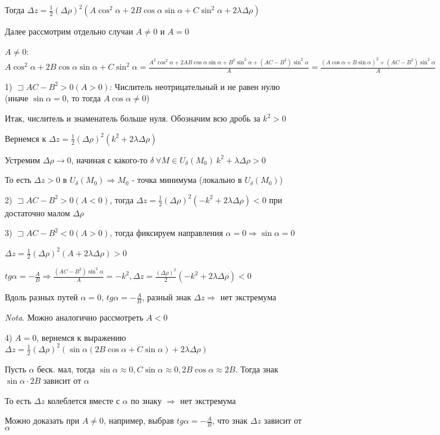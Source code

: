 \documentclass[12pt]{article}
\begin{document}
    Тогда $\displaystyle \Delta z = \frac{1}{2} (\Delta \rho)^2 (A\cos^2\alpha + 2B\cos\alpha\sin\alpha + C\sin^2\alpha + 2\lambda \Delta \rho)$

    Далее рассмотрим отдельно случаи $A \neq 0$ и $A = 0$

    $A \neq 0$: $\displaystyle A\cos^2\alpha + 2B\cos\alpha\sin\alpha + C\sin^2\alpha = \frac{A^2\cos^2\alpha + 2AB\cos\alpha\sin\alpha + B^2\sin^2\alpha + (AC - B^2)\sin^2\alpha}{A} =
    \frac{(A\cos\alpha + B\sin\alpha)^2 + (AC - B^2)\sin^2\alpha}{A}$

    1) $\sqsupset AC - B^2 > 0 (A > 0)$: Числитель неотрицательный и не равен нулю (иначе $\sin\alpha = 0$, то тогда $A\cos\alpha \neq 0$)

    Итак, числитель и знаменатель больше нуля. Обозначим всю дробь за $k^2 > 0$

    Вернемся к $\displaystyle \Delta z = \frac{1}{2}(\Delta \rho)^2 (k^2 + 2\lambda\Delta\rho)$

    Устремим $\Delta \rho \rightarrow 0$, начиная с какого-то $\delta \ \forall M \in U_\delta(M_0) \ k^2 + \lambda\Delta\rho > 0$

    То есть $\Delta z > 0$ в $U_\delta(M_0) \Longrightarrow M_0$ - точка минимума (локально в $U_\delta(M_0)$)

    2) $\sqsupset AC - B^2 > 0 (A < 0)$, тогда $\displaystyle \Delta z = \frac{1}{2}(\Delta \rho)^2 (-k^2 + 2\lambda\Delta\rho) < 0$ при достаточно малом $\Delta \rho$

    3) $\sqsupset AC - B^2 < 0 (A > 0)$, тогда фиксируем направления $\alpha = 0 \Longrightarrow \sin\alpha = 0$

    $\displaystyle \Delta z = \frac{1}{2}(\Delta \rho)^2 (A + 2\lambda\Delta\rho) > 0$

    $\displaystyle tg \alpha = -\frac{A}{B} \Longrightarrow \frac{(AC - B^2)\sin^2\alpha}{A} = -k^2, \Delta z = \frac{(\Delta \rho)^2}{2}(-k^2 + 2\lambda\Delta\rho) < 0$

    Вдоль разных путей $\alpha = 0$, $\displaystyle tg \alpha = -\frac{A}{B}$, разный знак $\Delta z \Longrightarrow$ нет экстремума

    \vspace{3mm}
\textit{Nota}. Можно аналогично рассмотреть $A < 0$

    4) $A = 0$, вернемся к выражению $\displaystyle \Delta z = \frac{1}{2} (\Delta \rho)^2 (\sin\alpha(2B\cos\alpha + C\sin\alpha) + 2\lambda\Delta\rho)$

    Пусть $\alpha$ беск. мал, тогда $\sin\alpha \approx 0, C\sin\alpha \approx 0, 2B\cos\alpha \approx 2B$. Тогда знак $\sin\alpha \cdot 2B$ зависит от $\alpha$

    То есть $\Delta z$ колеблется вместе с $\alpha$ по знаку $\Longrightarrow$ нет экстремума

    Можно доказать при $A \neq 0$, например, выбрав $\displaystyle tg \alpha = -\frac{A}{B}$, что знак $\Delta z$ зависит от $\alpha$
\end{document}
